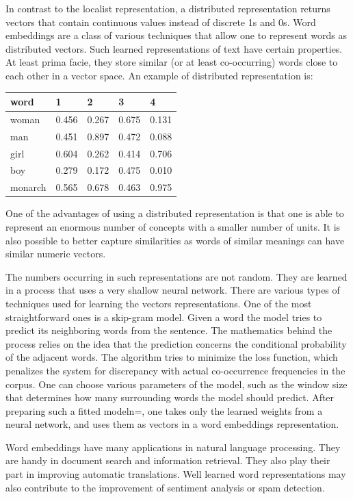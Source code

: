 \documentclass[
  12pt,
]{book}
\begin{document}
In contrast to the localist representation, a distributed representation returns vectors that contain continuous values instead of discrete 1s and 0s. Word embeddings are a class of various techniques that allow one to represent words as distributed vectors. Such learned representations of text have certain properties. At least prima facie, they store similar (or at least co-occurring) words close to each other in a vector space. An example of distributed representation is:

\begin{longtable}[]{@{}lllll@{}}
\toprule
word & 1 & 2 & 3 & 4 \\
\midrule
\endhead
woman & 0.456 & 0.267 & 0.675 & 0.131 \\
man & 0.451 & 0.897 & 0.472 & 0.088 \\
girl & 0.604 & 0.262 & 0.414 & 0.706 \\
boy & 0.279 & 0.172 & 0.475 & 0.010 \\
monarch & 0.565 & 0.678 & 0.463 & 0.975 \\
\bottomrule
\end{longtable}

One of the advantages of using a distributed representation is that one is able to represent an enormous number of concepts with a smaller number of units. It is also possible to better capture similarities as words of similar meanings can have similar numeric vectors.

The numbers occurring in such representations are not random. They are learned in a process that uses a very shallow neural network. There are various types of techniques used for learning the vectors representations. One of the most straightforward ones is a skip-gram model.
Given a word the model tries to predict its neighboring words from the sentence. The mathematics behind the process relies on the idea that the prediction concerns the conditional probability of the adjacent words. The algorithm tries to minimize the loss function, which penalizes the system for discrepancy with actual co-occurrence frequencies in the corpus. One can choose various parameters of the model, such as the window size that determines how many surrounding words the model should predict. After preparing such a fitted modeln=, one takes only the learned weights from a neural network, and uses them as vectors in a word embeddings representation.

Word embeddings have many applications in natural language processing. They are handy in document search and information retrieval. They also play their part in improving automatic translations. Well learned word representations may also contribute to the improvement of sentiment analysis or spam detection.
\end{document}
